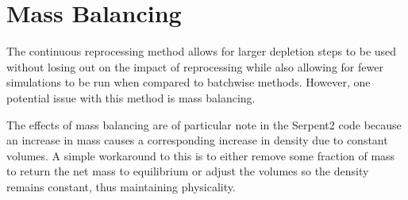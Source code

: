 






\section{Mass Balancing}

The continuous reprocessing method allows for larger depletion steps to be used without losing out on the impact of reprocessing while also allowing for fewer simulations to be run when compared to batchwise methods. However, one potential issue with this method is mass balancing.

The effects of mass balancing are of particular note in the Serpent2 code because an increase in mass causes a corresponding increase in density due to constant volumes. A simple workaround to this is to either remove some fraction of mass to return the net mass to equilibrium or adjust the volumes so the density remains constant, thus maintaining physicality.

